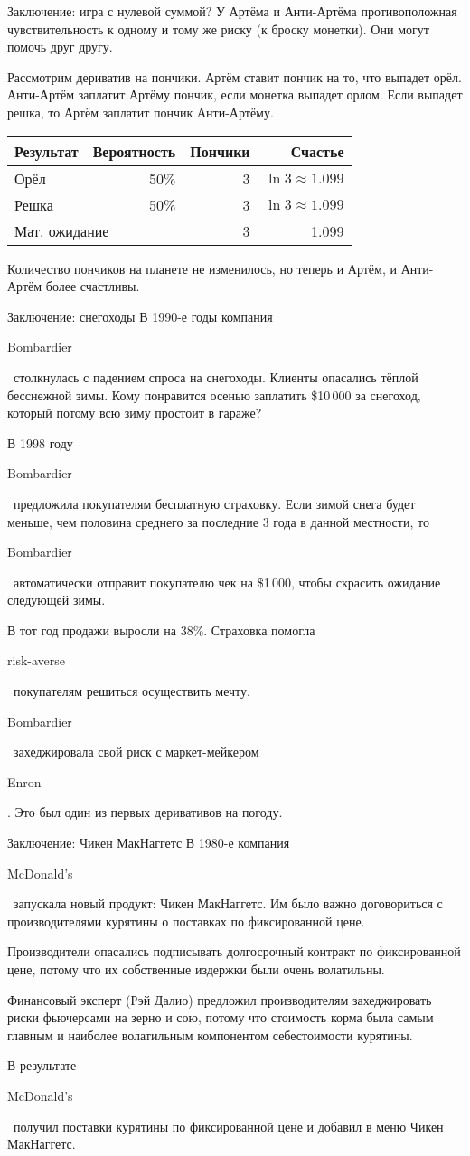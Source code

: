 \documentclass{beamer}
\newcommand{\en}[1]{\begin{otherlanguage}{english}#1\end{otherlanguage}}
\begin{document}
\begin{frame}{Заключение: игра с нулевой суммой?}
\justify
У Артёма и Анти-Артёма противоположная чувствительность к одному и тому же риску (к броску монетки). Они могут помочь друг другу.

\justify
Рассмотрим дериватив на пончики. Артём ставит пончик на то, что выпадет орёл. Анти-Артём заплатит Артёму пончик, если монетка выпадет орлом. Если выпадет решка, то Артём заплатит пончик Анти-Артёму.

\justify
\centering
\begin{tabular}{l|r|r|r}
Результат & Вероятность & Пончики & Счастье \\ \hline
Орёл & 50\% & 3 & $\ln 3 \approx 1.099$ \\
Решка & 50\% & 3 & $\ln 3 \approx 1.099$ \\ \hline
\multicolumn{2}{l|}{Мат. ожидание} & 3 & 1.099
\end{tabular}

\justify
Количество пончиков на планете не изменилось, но теперь и Артём, и Анти-Артём более счастливы.
\end{frame}



\begin{frame}{Заключение: снегоходы}
\justify
В 1990-е годы компания \en{Bombardier}\ столкнулась с падением спроса на снегоходы. Клиенты опасались тёплой бесснежной зимы. Кому понравится осенью заплатить \$10\,000 за снегоход, который потому всю зиму простоит в гараже?

\justify
В 1998 году \en{Bombardier}\ предложила покупателям бесплатную страховку. Если зимой снега будет меньше, чем половина среднего за последние 3 года в данной местности, то \en{Bombardier}\ автоматически отправит покупателю чек на \$1\,000, чтобы скрасить ожидание следующей зимы.

\justify
В тот год продажи выросли на 38\%. Страховка помогла \en{risk-averse}\ покупателям решиться осуществить мечту.

\justify
\en{Bombardier}\ захеджировала свой риск с маркет-мейкером \en{Enron}. Это был один из первых деривативов на погоду.
\end{frame}




\begin{frame}{Заключение: Чикен МакНаггетс}
\justify
В 1980-е компания \en{McDonald's}\ запускала новый продукт: Чикен МакНаггетс. Им было важно договориться с производителями курятины о поставках по фиксированной цене.

\justify
Производители опасались подписывать долгосрочный контракт по фиксированной цене, потому что их собственные издержки были очень волатильны.

\justify
Финансовый эксперт (Рэй Далио) предложил производителям захеджировать риски фьючерсами на зерно и сою, потому что стоимость корма была самым главным и наиболее волатильным компонентом себестоимости курятины.

\justify
В результате \en{McDonald's}\ получил поставки курятины по фиксированной цене и добавил в меню Чикен МакНаггетс. 
\end{frame}
\end{document}
